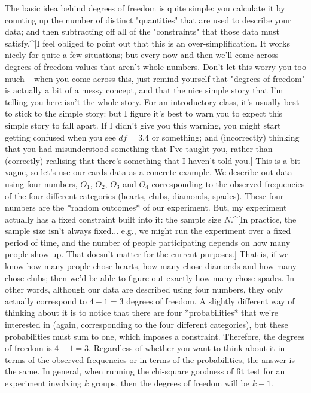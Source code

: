 The basic idea behind degrees of freedom is quite simple: you calculate it by counting up the number of distinct "quantities" that are used to describe your data; and then subtracting off all of the "constraints" that those data must satisfy.^[I feel obliged to point out that this is an over-simplification. It works nicely for quite a few situations; but every now and then we'll come across degrees of freedom values that aren't whole numbers. Don't let this worry you too much -- when you come across this, just remind yourself that "degrees of freedom" is actually a bit of a messy concept, and that the nice simple story that I'm telling you here isn't the whole story. For an introductory class, it's usually best to stick to the simple story: but I figure it's best to warn you to expect this simple story to fall apart. If I didn't give you this warning, you might start getting confused when you see $df = 3.4$ or something; and (incorrectly) thinking that you had misunderstood something that I've taught you, rather than (correctly) realising that there's something that I haven't told you.] This is a bit vague, so let's use our cards data as a concrete example. We describe out data using four numbers, $O_1$, $O_2$, $O_3$ and $O_4$ corresponding to the observed frequencies of the four different categories (hearts, clubs, diamonds, spades). These four numbers are the *random outcomes* of our experiment. But, my experiment actually has a fixed constraint built into it: the sample size $N$.^[In practice, the sample size isn't always fixed... e.g., we might run the experiment over a fixed period of time, and the number of people participating depends on how many people show up. That doesn't matter for the current purposes.] That is, if we know how many people chose hearts, how many chose diamonds and how many chose clubs; then we'd be able to figure out exactly how many chose spades. In other words, although our data are described using four numbers, they only actually correspond to $4-1 = 3$ degrees of freedom. A slightly different way of thinking about it is to notice that there are four *probabilities* that we're interested in (again, corresponding to the four different categories), but these probabilities must sum to one, which imposes a constraint. Therefore, the degrees of freedom is $4-1 = 3$. Regardless of whether you want to think about it in terms of the observed frequencies or in terms of the probabilities, the answer is the same. In general, when running the chi-square goodness of fit test for an experiment involving $k$ groups, then the degrees of freedom will be $k-1$.


